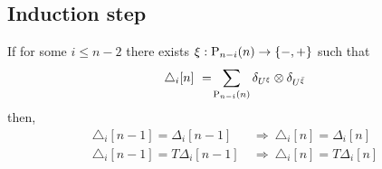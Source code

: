 \subsection{Induction step}

\begin{lemma}
     If for some $i \leq n - 2$ there exists $\xi : \P_{n-i}(n) \to \{-, +\}$ such that
     \[
     \triangle_i [n]\ =\! \sum_{\P_{n-i}(n)} \delta_{U^{\xi}} \ot \delta_{U^{{\bar{\xi}}}}
     \]
     then,
     \begin{align*}
     \triangle_i [n-1] = \Delta_i [n-1]
     \ & \Rightarrow \
     \triangle_i [n] = \Delta_i [n] \\
     \triangle_i [n-1] = T \Delta_i [n-1]
     \ & \Rightarrow \
     \triangle_i [n] = T \Delta_i [n]
     \end{align*}
\end{lemma}

